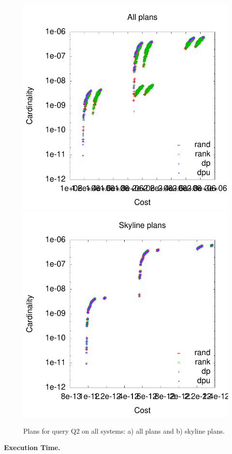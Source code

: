 \begin{figure}[htb]
  \centering
  \includegraphics[width=0.49\linewidth]{figs/plans_q2_all.pdf}
  \includegraphics[width=0.49\linewidth]{figs/plans_q2_sky.pdf}
  \caption{Plans for query Q2 on all systems: a) all plans and b)
    skyline plans.}
  \label{fig:pareto_q2_skyline}
\end{figure}

\textbf{Execution Time.} 


